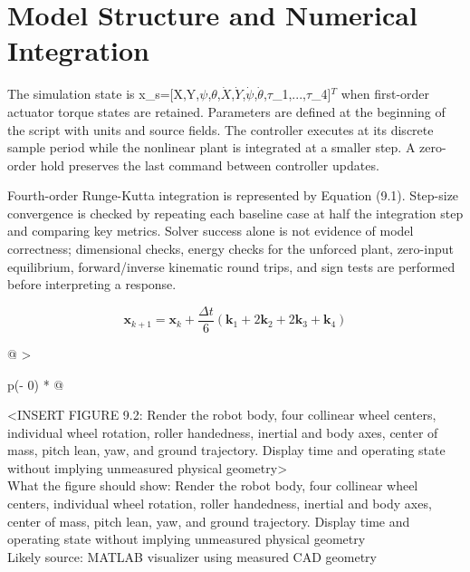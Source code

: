 \section{Model Structure and Numerical Integration}\label{model-structure-and-numerical-integration}

The simulation state is x\_s=[X,Y,\ensuremath{\psi},\ensuremath{\theta},\ensuremath{\dot{X}},\ensuremath{\dot{Y}},\ensuremath{\dot{\psi}},\ensuremath{\dot{\theta}},\ensuremath{\tau}\_1,...,\ensuremath{\tau}\_4]\ensuremath{^{T}} when
first-order actuator torque states are retained. Parameters are defined
at the beginning of the script with units and source fields. The
controller executes at its discrete sample period while the nonlinear
plant is integrated at a smaller step. A zero-order hold preserves the
last command between controller updates.

Fourth-order Runge-Kutta integration is represented by Equation (9.1).
Step-size convergence is checked by repeating each baseline case at half
the integration step and comparing key metrics. Solver success alone is
not evidence of model correctness; dimensional checks, energy checks for
the unforced plant, zero-input equilibrium, forward\slash{}inverse kinematic
round trips, and sign tests are performed before interpreting a
response.

\begin{equation}
\mathbf{x}_{k+1}=\mathbf{x}_{k}+\frac{\Delta t}{6}
\left(\mathbf{k}_1+2\mathbf{k}_2+2\mathbf{k}_3+\mathbf{k}_4\right)
\label{eq:9-1}
\end{equation}

\begin{longtable}[]{@{}
  >{\raggedright\arraybackslash}p{(\columnwidth - 0\tabcolsep) * }@{}}
\toprule\noalign{}
\begin{minipage}[b]{\linewidth}\raggedright
\textless INSERT FIGURE 9.2: Render the robot body, four collinear wheel
centers, individual wheel rotation, roller handedness, inertial and body
axes, center of mass, pitch lean, yaw, and ground trajectory. Display
time and operating state without implying unmeasured physical
geometry\textgreater{}\\
What the figure should show: Render the robot body, four collinear wheel
centers, individual wheel rotation, roller handedness, inertial and body
axes, center of mass, pitch lean, yaw, and ground trajectory. Display
time and operating state without implying unmeasured physical geometry\\
Likely source: MATLAB visualizer using measured CAD geometry\strut
\end{minipage} \\
\midrule\noalign{}
\endhead
\bottomrule\noalign{}
\endlastfoot
\end{longtable}

